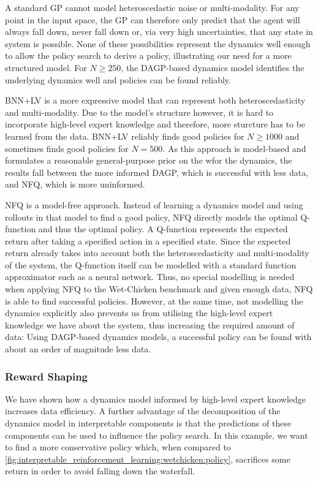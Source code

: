 A standard GP cannot model heteroscedastic noise or multi-modality.
For any point in the input space, the GP can therefore only predict that the agent will always fall down, never fall down or, via very high uncertainties, that any state in system is possible.
None of these possibilities represent the dynamics well enough to allow the policy search to derive a policy, illustrating our need for a more structured model.
For $N \geq 250$, the DAGP-based dynamics model identifies the underlying dynamics well and policies can be found reliably.

BNN+LV is a more expressive model that can represent both heteroscedasticity and multi-modality.
Due to the model's structure however, it is hard to incorporate high-level expert knowledge and therefore, more sturcture has to be learned from the data.
BNN+LV reliably finds good policies for $N \geq 1000$ and sometimes finds good policies for $N = 500$.
As this approach is model-based and formulates a reasonable general-purpose prior on the wfor the dynamics, the results fall between the more informed DAGP, which is successful with less data, and NFQ, which is more uninformed.

NFQ is a model-free approach.
Instead of learning a dynamics model and using rollouts in that model to find a good policy, NFQ directly models the optimal Q-function and thus the optimal policy.
A Q-function represents the expected return after taking a specified action in a specified state.
Since the expected return already takes into account both the heteroscedasticity and multi-modality of the system, the Q-function itself can be modelled with a standard function approximator such as a neural network.
Thus, no special modelling is needed when applying NFQ to the Wet-Chicken benchmark and given enough data, NFQ is able to find successful policies.
However, at the same time, not modelling the dynamics explicitly also prevents us from utilising the high-level expert knowledge we have about the system, thus increasing the required amount of data:
Using DAGP-based dynamics models, a successful policy can be found with about an order of magnitude less data.


\subsubsection{Reward Shaping}
\label{toc:interpretable_rl:reward_shaping}
We have shown how a dynamics model informed by high-level expert knowledge increases data efficiency.
A further advantage of the decomposition of the dynamics model in interpretable components is that the predictions of these components can be used to influence the policy search.
In this example, we want to find a more conservative policy which, when compared to \cref{fig:interpretable_reinforcement_learning:wetchicken:policy}, sacrifices some return in order to avoid falling down the waterfall.

